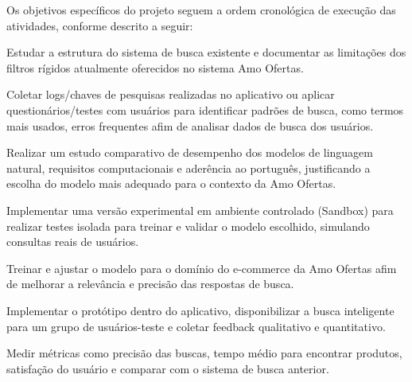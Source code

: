 \label{ssec:objetivos-especificos}

Os objetivos específicos do projeto seguem a ordem cronológica de execução das atividades, conforme descrito a seguir:

\begin{myitemize}
    \item Estudar a estrutura do sistema de busca existente e documentar as limitações dos filtros rígidos atualmente oferecidos no sistema Amo Ofertas.
    
    \item Coletar logs/chaves de pesquisas realizadas no aplicativo ou aplicar questionários/testes com usuários para identificar 
    padrões de busca, como termos mais usados, erros frequentes afim de analisar dados de busca dos usuários.
      
    \item Realizar um estudo comparativo de desempenho dos modelos de linguagem natural, requisitos computacionais e aderência ao português, 
     justificando a escolha do modelo mais adequado para o contexto da Amo Ofertas.
    
    \item Implementar uma versão experimental em ambiente controlado (Sandbox) para realizar testes isolada para treinar e validar o modelo escolhido,
      simulando consultas reais de usuários.
    
    \item Treinar e ajustar o modelo para o domínio do e-commerce da Amo Ofertas afim de melhorar a relevância e precisão das respostas de busca.
    
    \item Implementar o protótipo dentro do aplicativo, disponibilizar a busca inteligente para um grupo de usuários-teste e coletar feedback qualitativo e quantitativo.
    
    \item Medir métricas como precisão das buscas, tempo médio para encontrar produtos, satisfação do usuário e comparar com o sistema de busca anterior.
\end{myitemize}